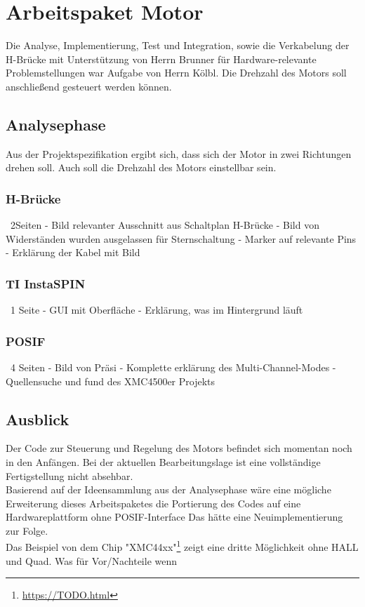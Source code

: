 
\chapter{Arbeitspaket Motor}
Die Analyse, Implementierung, Test und Integration, sowie die Verkabelung der H-Brücke mit Unterst\"utzung von Herrn Brunner f\"ur Hardware-relevante Problemstellungen war Aufgabe von Herrn Kölbl. Die Drehzahl des Motors soll anschließend gesteuert werden können.

\section{Analysephase}
Aus der Projektspezifikation ergibt sich, dass sich der Motor in zwei Richtungen drehen soll. Auch soll die Drehzahl des Motors einstellbar sein.

\subsection{H-Br\"ucke} ~2Seiten
- Bild relevanter Ausschnitt aus Schaltplan H-Brücke
- Bild von Widerständen wurden ausgelassen für Sternschaltung
- Marker auf relevante Pins
- Erklärung der Kabel mit Bild
\subsection{TI InstaSPIN} ~1 Seite
- GUI mit Oberfläche
- Erklärung, was im Hintergrund läuft
\subsection{POSIF} ~4 Seiten
- Bild von Präsi
- Komplette erklärung des Multi-Channel-Modes
- Quellensuche und fund des XMC4500er Projekts

\section{Ausblick}
Der Code zur Steuerung und Regelung des Motors befindet sich momentan noch in den Anfängen. Bei der aktuellen Bearbeitungslage ist eine vollständige Fertigstellung nicht absehbar. \\
Basierend auf der Ideensammlung aus der Analysephase wäre eine mögliche Erweiterung dieses Arbeitspaketes die Portierung des Codes auf eine Hardwareplattform ohne POSIF-Interface Das hätte eine Neuimplementierung zur Folge. \\
Das Beispiel von dem Chip "XMC44xx"\footnote{\url{https://TODO.html}} zeigt eine dritte Möglichkeit ohne HALL und Quad. Was für Vor/Nachteile wenn
